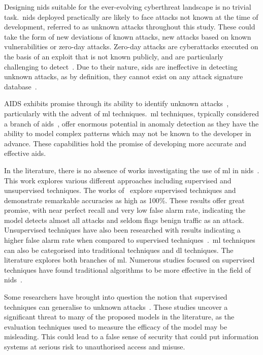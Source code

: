Designing \gls{nids} suitable for the ever-evolving cyberthreat landscape is no
trivial task.\ \gls{nids} deployed practically are likely to face attacks not
known at the time of development, referred to as unknown attacks throughout
this study. These could take the form of new deviations of known attacks,
new attacks based on known vulnerabilities or zero-day attacks. Zero-day
attacks are cyberattacks executed on the basis of an exploit that is not known
publicly, and are particularly challenging to detect~\cite{zero-day-def}. Due
to their nature, \gls{sids} are ineffective in detecting unknown attacks, as by
definition, they cannot exist on any attack signature database~\cite{survey1}.

AIDS exhibits promise through its ability to identify unknown
attacks~\cite{aids-unknown}, particularly with the advent of \gls{ml}
techniques.\ \gls{ml} techniques, typically considered a branch of
\gls{aids}~\cite{survey1}, offer enormous potential in anomaly detection as
they have the ability to model complex patterns which may not be known to the
developer in advance. These capabilities hold the promise of developing more
accurate and effective \gls{aids}.

In the literature, there is no absence of works investigating the use of
\gls{ml} in \gls{nids}~\cite{Karatas, Jiang, Mighan, Pu, Cao, Atefinia}. This
work explores various different approaches including supervised and
unsupervised techniques. The works of~\cite{Karatas, Jiang, Mighan, Atefinia}
explore supervised techniques and demonstrate remarkable accuracies as high as
100\%. These results offer great promise, with near perfect recall and very low
false alarm rate, indicating the model detects almost all attacks and seldom
flags benign traffic as an attack. Unsupervised techniques have also been
researched with results indicating a higher false alarm rate when compared to
supervised techniques~\cite{Zoppi}.\ \gls{ml} techniques can also be
categorised into traditional techniques and \gls{dl} techniques. The literature
explores both branches of \gls{ml}. Numerous studies focused on supervised
techniques have found traditional algorithms to be more effective in the field
of \gls{nids}~\cite{Liu, Zoppi}.

Some researchers have brought into question the notion that supervised
techniques can generalise to unknown attacks~\cite{Kus, Zoppi}. These studies
uncover a significant threat to many of the proposed models in the literature,
as the evaluation techniques used to measure the efficacy of the model may be
misleading. This could lead to a false sense of security that could put
information systems at serious risk to unauthorised access and misuse.

